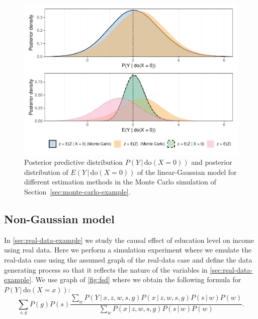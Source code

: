 \documentclass[11pt,a4paper,twoside]{article}
\newcommand{\+}[1]{\ensuremath{\mathbf{#1}}}
\newcommand{\doo}{\textrm{do}}
\newcommand{\given}{{ \, | \, }}
\begin{document}
	\begin{figure}[!ht]
		\includegraphics[width=\textwidth]{figures/gaussian_mc.pdf} 
		\caption{Posterior predictive distribution $P(Y \given \doo(X = 0))$ and posterior distribution of $E(Y \given \doo(X = 0))$ of the linear-Gaussian model for different estimation methods in the Monte Carlo simulation of Section~\ref{sec:monte-carlo-example}.}
		\label{fig:gaussian-montecarlo}
	\end{figure}
	
	\subsection{Non-Gaussian model}
	\label{sec:nongaussian}
	
	
	In \autoref{sec:real-data-example} we study the causal effect of education level on income using real data. Here we perform a simulation experiment where we emulate the real-data case using the assumed graph of the real-data case and define the data generating process so that it reflects the nature of the variables in \autoref{sec:real-data-example}. We use graph of \autoref{fig:fsd} where we obtain the following formula for $P(Y \given \doo(X = x))$:
	\begin{equation}
	\label{eq:fsd}
	\sum_{s,g} P(g)P(s)\frac{\sum_{w} P(Y\given x, z, w, s, g)P(x \given z,w,s,g)P(s \given w)P(w)}{\sum_{w} P(x \given z,w,s,g)P(s\given w)P(w)}.
	\end{equation}
\end{document}
